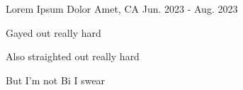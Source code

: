   \begin{cventry}
    {Lorem} %
    {Ipsum Dolor} %
    {Amet, CA} %
    {Jun. 2023 - Aug. 2023} %
    {
      \begin{cvitems} %
        \item {
        Gayed out really hard
        }
        \item {
        Also straighted out really hard
        }
        \item {
        But I'm not Bi I swear
        }
      \end{cvitems}
    }
  \end{cventry}
